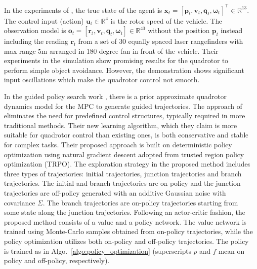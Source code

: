 \documentclass{article}
\newcommand{\B}[1]{\mathbf{#1}}
\begin{document}
In the experiments of \textcite{zhang2016learning}, the true state 
of the agent is $\B{x}_t = \left[ \B{p}_t, \B{v}_t, \B{q}_t, \boldsymbol{\omega}_t \right]^\top \in \mathbb{R}^{13}$.
The control input (action) $\B{u}_t \in \mathbb{R}^4$ is the 
rotor speed of the vehicle.
The observation model is $\B{o}_t = \left[ 
  \B{r}_t, \B{v}_t, \B{q}_t, \boldsymbol{\omega}_t 
\right] \in \mathbb{R}^{40}$  without the position $\B{p}_t$
instead including the reading $\B{r}_t$ from a set of 30 
equally spaced laser rangefinders with max range 5m arranged
in 180 degree fan in front of the vehicle.
Their experiments in the simulation show promising results 
for the quadrotor to perform simple object avoidance.
However, the demonstration shows significant input oscillations 
which make the quadrotor control not smooth.


In the guided policy search work \parencite{zhang2016learning}, 
there is a prior approximate quadrotor dynamics model for the 
MPC to generate guided trajectories.
The approach of \cite{hwangbo2017control} eliminates the need for predefined control structures, typically required in more traditional methods. 
Their new learning algorithm, which they claim is more suitable for quadrotor control than existing ones, is both conservative and stable for complex tasks. 
Their proposed approach is built on deterministic policy optimization using natural gradient descent adopted from trusted region policy optimization (TRPO).
The exploration strategy in the proposed method includes three types of 
trajectories: initial trajectories, junction trajectories and branch trajectories. The initial and branch trajectories are on-policy and the junction trajectories are off-policy generated with an additive Gaussian noise with covariance $\Sigma$. The branch trajectories are on-policy trajectories starting from some state along the junction trajectories.
Following an actor-critic fashion, the proposed method consists of a value and a policy network.
The value network is trained using Monte-Carlo samples 
obtained from on-policy trajectories, 
while the policy optimization utilizes both on-policy and 
off-policy trajectories.
The policy is trained as in Algo.~\ref{algo:policy_optimization} 
(superscripts $p$ and $f$ mean on-policy and off-policy, respectively).
\end{document}
